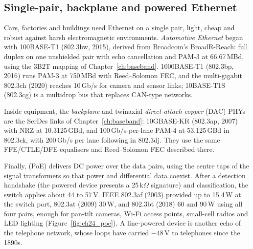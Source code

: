 
\subsection{Single-pair, backplane and powered Ethernet}

Cars, factories and buildings need Ethernet on a single pair, light, cheap and robust against harsh
electromagnetic environments. \emph{Automotive Ethernet} began with 100BASE-T1 (802.3bw, 2015), derived
from Broadcom's BroadR-Reach: full duplex on one unshielded pair with echo cancellation and PAM-3 at
66.67\,MBd, using the 3B2T mapping of Chapter~\ref{ch:baseband}. 1000BASE-T1 (802.3bp, 2016) runs
PAM-3 at 750\,MBd with Reed--Solomon FEC, and the multi-gigabit 802.3ch (2020) reaches 10\,Gb/s for
camera and sensor links; 10BASE-T1S (802.3cg) is a multidrop bus that replaces CAN-type networks.

Inside equipment, the \emph{backplane} and twinaxial \emph{direct-attach copper} (DAC) PHYs are the
SerDes links of Chapter~\ref{ch:baseband}: 10GBASE-KR (802.3ap, 2007) with NRZ at 10.3125\,GBd, and
100\,Gb/s-per-lane PAM-4 at 53.125\,GBd in 802.3ck, with 200\,Gb/s per lane following in 802.3dj. They
use the same FFE/CTLE/DFE equalisers and Reed--Solomon FEC described there.

Finally,  (PoE) delivers DC power over the data pairs, using the centre taps
of the signal transformers so that power and differential data coexist. After a detection handshake
(the powered device presents a 25\,k$\Omega$ signature) and classification, the switch applies about
44 to 57\,V. IEEE 802.3af (2003) provided up to 15.4\,W at the switch port, 802.3at (2009) 30\,W, and
802.3bt (2018) 60 and 90\,W using all four pairs, enough for pan-tilt cameras, Wi-Fi access points,
small-cell radios and LED lighting (Figure~\ref{fig:ch24_poe}). A line-powered device is another echo
of the telephone network, whose loops have carried $-48$\,V to telephones since the 1890s.




